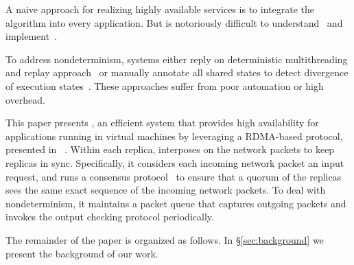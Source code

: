 A naive approach for realizing highly available services is to integrate the \paxos algorithm 
into every application. But \paxos is notoriously difficult to understand~\cite{raft:usenix14} 
and implement~\cite{paxos:practical}.

To address nondeterminism, \smr systems either reply on deterministic multithreading and replay 
approach~\cite{rex:eurosys14} or manually annotate all shared states to detect divergence of execution 
states~\cite{eve:osdi12}. These approaches suffer from poor automation or high overhead.

This paper presents \xxx, an efficient \smr system that provides high availability for applications 
running in virtual machines by leveraging a RDMA-based \paxos protocol, presented in 
\protocol~\cite{dare:hpdc15}. Within each replica, \xxx interposes on the network packets to keep 
replicas in sync. Specifically, it considers each incoming network packet an input request, and runs 
a \paxos consensus protocol~\cite{paxos:practical} to ensure that a quorum of the replicas sees the 
same exact sequence of the incoming network packets. To deal with nondeterminism, it maintains a packet 
queue that captures outgoing packets and invokes the output checking protocol periodically.

The remainder of the paper is organized as follows. In \S\ref{sec:background} we present the background 
of our work.
